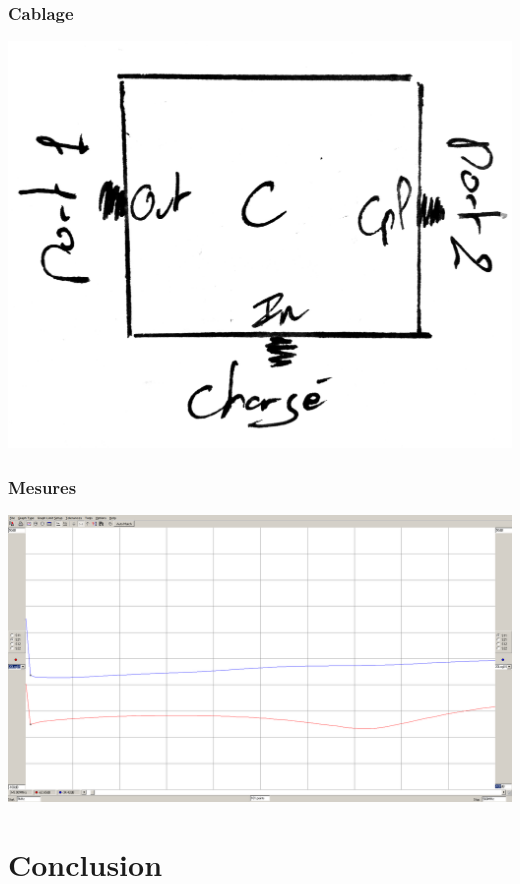 \documentclass[a4paper,12pt]{report}            %
\begin{document}
\subsection{Cablage}
\begin{center}\includegraphics[scale = 0.17]{pic/CDOP.png}\\ \end{center}

\subsection{Mesures}
\begin{center}\includegraphics[scale = 0.25]{pic/Isolation_CD.png} \\\end{center}

\chapter{Conclusion}
\end{document}
